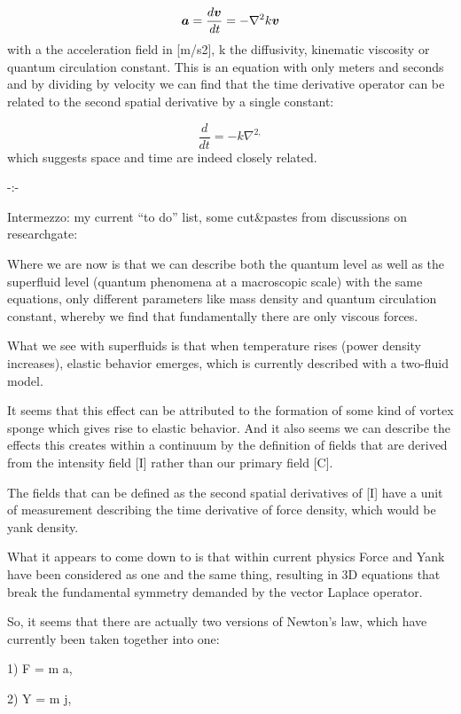 \documentclass{article}
\newcommand\boldsubformula[1]{\text{\mathversion{bold}$#1$}}
\begin{document}
\begin{equation}
\boldsubformula a=\frac{d\boldsubformula v}{\mathit{dt}}=-{\nabla}^2k\boldsubformula v
\end{equation}
with a the acceleration field in [m/s2], k the diffusivity, kinematic viscosity or quantum circulation constant. This is
an equation with only meters and seconds and by dividing by velocity we can find that the time derivative operator can
be related to the second spatial derivative by a single constant:

\begin{equation}
\frac d{\mathit{dt}}=-k{\nabla}^{2,}
\end{equation}
which suggests space and time are indeed closely related.

{}-:-

Intermezzo:  my current ``to do'' list, some cut\&pastes from discussions on researchgate:

Where we are now is that we can describe both the quantum level as well as the superfluid level (quantum phenomena at a
macroscopic scale) with the same equations, only different parameters like mass density and quantum circulation
constant, whereby we find that fundamentally there are only viscous forces.

What we see with superfluids is that when temperature rises (power density increases), elastic behavior emerges, which
is currently described with a two-fluid model.

It seems that this effect can be attributed to the formation of some kind of vortex sponge which gives rise to elastic
behavior. And it also seems we can describe the effects this creates within a continuum by the definition of fields
that are derived from the intensity field [I] rather than our primary field [C].

The fields that can be defined as the second spatial derivatives of [I] have a unit of measurement describing the time
derivative of force density, which would be yank density.

What it appears to come down to is that within current physics Force and Yank have been considered as one and the same
thing, resulting in 3D equations that break the fundamental symmetry demanded by the vector Laplace operator.

So, it seems that there are actually two versions of Newton's law, which have currently been taken together into one:

1) F = m a,

2) Y = m j,
\end{document}
